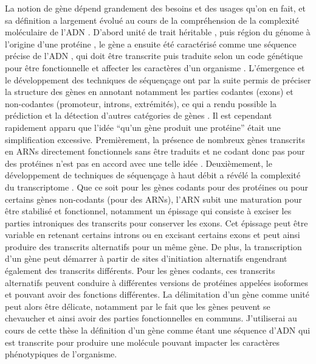 La notion de gène dépend grandement des besoins et des usages qu’on en fait, et sa définition a largement évolué au cours de la compréhension de la complexité moléculaire de l’\acrshort{ADN} \citep{gerstein_what_2007}. D’abord unité de trait héritable \citep{mendel_verhandlungen_1866}, puis région du génome à l’origine d’une protéine \citep{morgan_mechanism_1915,beadle_genetic_1941}, le gène a ensuite été caractérisé comme une séquence précise de l’\acrshort{ADN} \citep{watson_molecular_1953}, qui doit être transcrite puis traduite selon un code génétique pour être fonctionnelle et affecter les caractères d’un organisme \citep{nirenberg_rna_1965}. L’émergence et le développement des techniques de séquençage ont par la suite permis de préciser la structure des gènes en annotant notamment les parties codantes (exons) et non-codantes (promoteur, introns, extrémités), ce qui a rendu possible la prédiction et la détection d’autres catégories de gènes \citep{fiers_complete_1976, doolittle_urfs_1986}. Il est cependant rapidement apparu que l’idée “qu’un gène produit une protéine” était une simplification excessive. Premièrement, la présence de nombreux gènes transcrits en \acrshort{ARN}s directement fonctionnels sans être traduits et ne codant donc pas pour des protéines n'est pas en accord avec une telle idée \citep{lander_initial_2001}. Deuxièmement, le développement de techniques de séquençage à haut débit a révélé la complexité du \gls{transcriptome} \citep{birney_identification_2007, encode_project_consortium_integrated_2012}. Que ce soit pour les gènes codants pour des protéines ou pour certains gènes non-codants (pour des \acrshort{ARN}s), l’\acrshort{ARN} subit une maturation pour être stabilisé et fonctionnel, notamment un épissage qui consiste à exciser les parties introniques des transcrits pour conserver les exons. Cet épissage peut être variable en retenant certains introns ou en excisant certains exons et peut ainsi produire des transcrits alternatifs pour un même gène. De plus, la transcription d’un gène peut démarrer à partir de sites d’initiation alternatifs engendrant également des transcrits différents. Pour les gènes codants, ces transcrits alternatifs peuvent conduire à différentes versions de protéines appelées isoformes et pouvant avoir des fonctions différentes. La délimitation d’un gène comme unité peut alors être délicate, notamment par le fait que les gènes peuvent se chevaucher et ainsi avoir des parties fonctionnelles en communs. J’utiliserai au cours de cette thèse la définition d’un gène comme étant une séquence d’\acrshort{ADN} qui est transcrite pour produire une molécule pouvant impacter les caractères phénotypiques de l’organisme. \\


